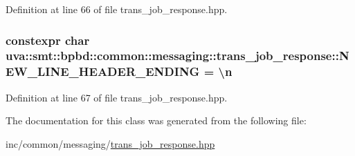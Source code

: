 Definition at line 66 of file trans\+\_\+job\+\_\+response.\+hpp.

\hypertarget{classuva_1_1smt_1_1bpbd_1_1common_1_1messaging_1_1trans__job__response_a98f9ad4c608c7519a5a73efe2857f0e2}{}
\subsubsection[{N\+E\+W\+\_\+\+L\+I\+N\+E\+\_\+\+H\+E\+A\+D\+E\+R\+\_\+\+E\+N\+D\+I\+N\+G}]{\setlength{\rightskip}{0pt plus 5cm}constexpr char uva\+::smt\+::bpbd\+::common\+::messaging\+::trans\+\_\+job\+\_\+response\+::\+N\+E\+W\+\_\+\+L\+I\+N\+E\+\_\+\+H\+E\+A\+D\+E\+R\+\_\+\+E\+N\+D\+I\+N\+G = \textquotesingle{}\textbackslash{}n\textquotesingle{}\hspace{0.3cm}{\ttfamily [static]}}\label{classuva_1_1smt_1_1bpbd_1_1common_1_1messaging_1_1trans__job__response_a98f9ad4c608c7519a5a73efe2857f0e2}


Definition at line 67 of file trans\+\_\+job\+\_\+response.\+hpp.



The documentation for this class was generated from the following file\+:\begin{DoxyCompactItemize}
\item 
inc/common/messaging/\hyperlink{trans__job__response_8hpp}{trans\+\_\+job\+\_\+response.\+hpp}\end{DoxyCompactItemize}
